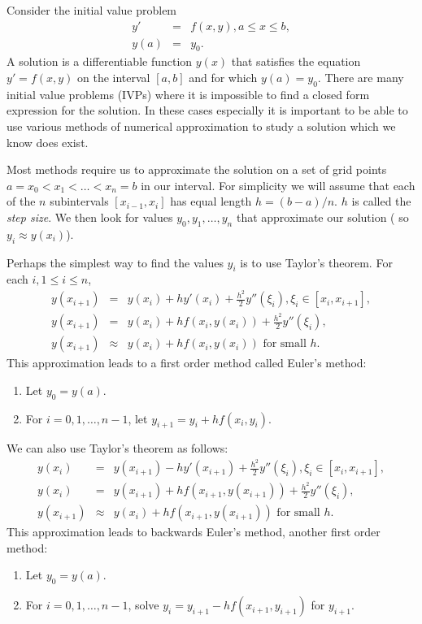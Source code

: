 \label{lab:IVP}


Consider the initial value problem 
\begin{eqnarray*}
y' &=& f(x,y), a \leq x \leq b, \\
y(a) &=& y_0.
\end{eqnarray*}
A solution is a differentiable function $y(x)$ that satisfies the equation $y' = f(x,y)$ on the interval $[a,b]$ and for which $y(a) = y_0$.  There are many initial value problems (IVPs) where it is impossible to find a closed form expression for the solution. In these cases especially it is important to be able to use various methods of numerical approximation to study a solution which we know does exist. 

Most methods require us to approximate the solution on a set of grid points $a = x_0< x_1<\hdots< x_n = b$ in our interval.  For simplicity we will assume that each of the $n$ subintervals $[x_{i-1},x_i]$ has equal length $h = (b-a)/n$. $h$ is called the \textit{step size}. We then look for values $y_0,y_1, \hdots, y_n$ that approximate our solution ( so $y_i \approx y(x_i)$).  

Perhaps the simplest way to find the values $y_i$ is to use Taylor's theorem. For each $i, 1 \leq i \leq n$, 
\begin{eqnarray*}
y(x_{i+1}) &=& y(x_{i}) + h y'(x_i) + \frac{h^2}{2} y''(\xi_i), \xi_i \in [x_i,x_{i+1}], \\
y(x_{i+1}) &=& y(x_{i}) + h f(x_i,y(x_i)) + \frac{h^2}{2} y''(\xi_i),\\
y(x_{i+1}) &\approx & y(x_{i}) + h f(x_i,y(x_i)) \text{ for small } h .
\end{eqnarray*}
This approximation leads to a first order method called Euler's method: 
\begin{enumerate}
\item Let $y_0 = y(a)$. 
\item For $i = 0, 1, \hdots, n-1$, let $y_{i+1} = y_i +hf(x_i,y_i)$. 
\end{enumerate}

We can also use Taylor's theorem as follows: 
\begin{eqnarray*}
y(x_{i}) &=& y(x_{i+1}) - h y'(x_{i+1}) + \frac{h^2}{2} y''(\xi_i), \xi_i \in [x_i,x_{i+1}], \\
y(x_{i}) &=& y(x_{i+1}) + h f(x_{i+1},y(x_{i+1})) + \frac{h^2}{2} y''(\xi_i),\\
y(x_{i+1}) &\approx & y(x_{i}) + h f(x_{i+1},y(x_{i+1}))  \text{ for small } h .
\end{eqnarray*}
This approximation leads to backwards Euler's method, another first order method: 
\begin{enumerate}
\item Let $y_0 = y(a)$. 
\item For $i = 0, 1, \hdots, n-1$, solve  $y_{i} = y_{i+1}-hf(x_{i+1},y_{i+1})$ for $y_{i+1}$. 
\end{enumerate}

